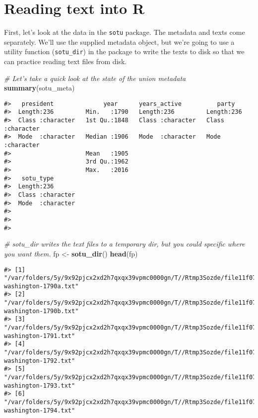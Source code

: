 \documentclass[]{book}
\newenvironment{Shaded}{\begin{snugshade}}{\end{snugshade}}
\newcommand{\CommentTok}[1]{\textcolor[rgb]{0.56,0.35,0.01}{\textit{#1}}}
\newcommand{\KeywordTok}[1]{\textcolor[rgb]{0.13,0.29,0.53}{\textbf{#1}}}
\newcommand{\NormalTok}[1]{#1}
\newcommand{\StringTok}[1]{\textcolor[rgb]{0.31,0.60,0.02}{#1}}
\begin{document}
\hypertarget{reading-text-into-r}{%
\section{Reading text into R}\label{reading-text-into-r}}

First, let's look at the data in the \texttt{sotu} package. The metadata and texts come separately. We'll use the supplied metadata object, but we're going to use a utility function (\texttt{sotu\_dir}) in the package to write the texts to disk so that we can practice reading text files from disk.

\begin{Shaded}
\begin{Highlighting}[]
\CommentTok{# Let's take a quick look at the state of the union metadata}
\KeywordTok{summary}\NormalTok{(sotu_meta)}
\end{Highlighting}
\end{Shaded}

\begin{verbatim}
#>   president              year      years_active          party          
#>  Length:236         Min.   :1790   Length:236         Length:236        
#>  Class :character   1st Qu.:1848   Class :character   Class :character  
#>  Mode  :character   Median :1906   Mode  :character   Mode  :character  
#>                     Mean   :1905                                        
#>                     3rd Qu.:1962                                        
#>                     Max.   :2016                                        
#>   sotu_type        
#>  Length:236        
#>  Class :character  
#>  Mode  :character  
#>                    
#>                    
#> 
\end{verbatim}

\begin{Shaded}
\begin{Highlighting}[]
\CommentTok{# sotu_dir writes the text files to a temporary dir, but you could specific where you want them.}
\NormalTok{fp <-}\StringTok{ }\KeywordTok{sotu_dir}\NormalTok{()}
\KeywordTok{head}\NormalTok{(fp)}
\end{Highlighting}
\end{Shaded}

\begin{verbatim}
#> [1] "/var/folders/5y/9x92pjcx2xd2h7qxqx39vpmc0000gn/T//Rtmp3Sozde/file11f07a08734b/george-washington-1790a.txt"
#> [2] "/var/folders/5y/9x92pjcx2xd2h7qxqx39vpmc0000gn/T//Rtmp3Sozde/file11f07a08734b/george-washington-1790b.txt"
#> [3] "/var/folders/5y/9x92pjcx2xd2h7qxqx39vpmc0000gn/T//Rtmp3Sozde/file11f07a08734b/george-washington-1791.txt" 
#> [4] "/var/folders/5y/9x92pjcx2xd2h7qxqx39vpmc0000gn/T//Rtmp3Sozde/file11f07a08734b/george-washington-1792.txt" 
#> [5] "/var/folders/5y/9x92pjcx2xd2h7qxqx39vpmc0000gn/T//Rtmp3Sozde/file11f07a08734b/george-washington-1793.txt" 
#> [6] "/var/folders/5y/9x92pjcx2xd2h7qxqx39vpmc0000gn/T//Rtmp3Sozde/file11f07a08734b/george-washington-1794.txt"
\end{verbatim}
\end{document}
